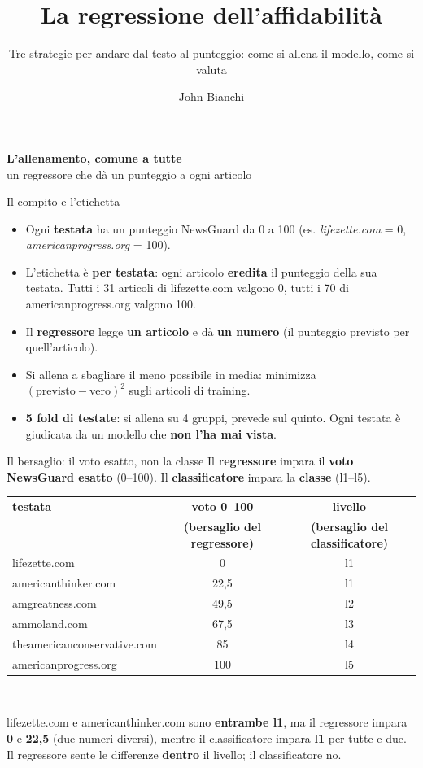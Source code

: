\documentclass[aspectratio=169]{beamer}
\title[La regressione]{La regressione dell'affidabilit\`a}
\subtitle{Tre strategie per andare dal testo al punteggio: come si allena il modello, come si valuta}
\author[John Bianchi]{John Bianchi}
\institute[]{IMT Lucca \& IIT-CNR Pisa}
\date{}
\newcommand{\hl}[1]{\textbf{#1}}
\newcommand{\divider}[2]{%
  \begin{frame}[plain]
    \vfill
    \begin{center}
      {\color{dividerblue}\Huge\textbf{#1}}\\[0.8em]
      {\large #2}
    \end{center}
    \vfill
  \end{frame}}
\begin{document}
\begin{frame}
  \titlepage
\end{frame}

\divider{L'allenamento, comune a tutte}{un regressore che d\`a un punteggio a ogni articolo}

\begin{frame}{Il compito e l'etichetta}
  \vfill
  \begin{itemize}
    \setlength\itemsep{0.8em}
    \item Ogni \hl{testata} ha un punteggio NewsGuard da 0 a 100 (es. \textit{lifezette.com} = 0, \textit{americanprogress.org} = 100).
    \item L'etichetta \`e \hl{per testata}: ogni articolo \hl{eredita} il punteggio della sua testata. Tutti i 31 articoli di
          lifezette.com valgono 0, tutti i 70 di americanprogress.org valgono 100.
    \item Il \hl{regressore} legge \hl{un articolo} e d\`a \hl{un numero} (il punteggio previsto per quell'articolo).
    \item Si allena a sbagliare il meno possibile in media: minimizza $(\text{previsto}-\text{vero})^2$ sugli articoli di training.
    \item \hl{5 fold di testate}: si allena su 4 gruppi, prevede sul quinto. Ogni testata \`e giudicata da un modello che
          \hl{non l'ha mai vista}.
  \end{itemize}
  \vfill
\end{frame}

\begin{frame}{Il bersaglio: il voto esatto, non la classe}
  \vfill
  \centering\small
  Il \hl{regressore} impara il \hl{voto NewsGuard esatto} (0--100). Il \hl{classificatore} impara la \hl{classe} (l1--l5).\\[0.7em]
  \begin{tabular}{lcc}
    \toprule
    \textbf{testata} & \textbf{voto 0--100} & \textbf{livello} \\
     & \textbf{(bersaglio del regressore)} & \textbf{(bersaglio del classificatore)} \\
    \midrule
    lifezette.com & 0 & l1 \\
    americanthinker.com & 22,5 & l1 \\
    amgreatness.com & 49,5 & l2 \\
    ammoland.com & 67,5 & l3 \\
    theamericanconservative.com & 85 & l4 \\
    americanprogress.org & 100 & l5 \\
    \bottomrule
  \end{tabular}\\[1em]
  \raggedright
  lifezette.com e americanthinker.com sono \hl{entrambe l1}, ma il regressore impara \hl{0} e \hl{22,5} (due numeri diversi),
  mentre il classificatore impara \hl{l1} per tutte e due. Il regressore sente le differenze \hl{dentro} il livello; il classificatore no.
\end{frame}
\end{document}
